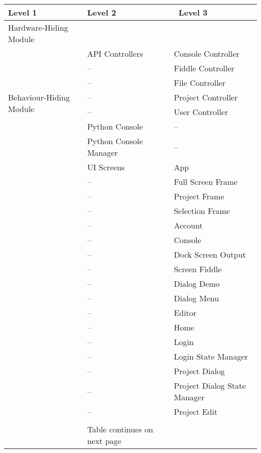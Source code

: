 \documentclass[12pt, titlepage]{article}
\begin{document}
\begin{table}[h!]
\centering
\begin{tabular}{p{} p{} p{}}
\toprule
    \textbf{Level 1} & \textbf{Level 2} &\ \textbf{Level 3}\\
\midrule

{Hardware-Hiding Module} & ~ \\
\midrule

\multirow{7}{0.3\textwidth}{
    Behaviour-Hiding Module} & API Controllers & Console Controller\\
    & -- & Fiddle Controller\\
    & -- & File Controller\\
    & -- & Project Controller\\
    & -- & User Controller\\

    & Python Console & --\\
    & Python Console Manager & --\\

    & UI Screens & App\\
    & -- & Full Screen Frame\\
    & -- & Project Frame\\
    & -- & Selection Frame\\
    & -- & Account\\
    & -- & Console\\
    & -- & Dock Screen Output\\
    & -- & Screen Fiddle\\
    & -- & Dialog Demo\\
    & -- & Dialog Menu\\
    & -- & Editor\\
    & -- & Home\\
    & -- & Login\\
    & -- & Login State Manager\\
    & -- & Project Dialog\\
    & -- & Project Dialog State Manager\\
    & -- & Project Edit\\
    & & \\
\bottomrule
    & Table continues on next page & \\
\end{tabular}
\end{table}
\end{document}
